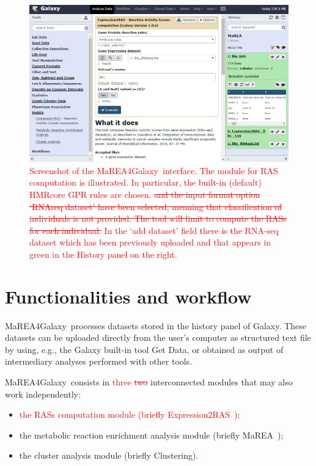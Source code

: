 \documentclass[preprint,12pt,authoryear]{elsarticle}
\newcommand{\red}{\textcolor{red}}
\newcommand{\mareagalaxy}{\textsf{MaREA4Galaxy}}
\newcommand{\mareaTool}{\textsf{MaREA}}
\newcommand{\clusterTool}{\textsf{Clustering}}
\newcommand{\RASTool}{\textsf{Expression2RAS}}
\begin{document}
\begin{figure}[ht]
  \includegraphics[width=1\textwidth]{figs/screenshot1v2q.png}
  \caption{\red{Screenshot of the \mareagalaxy\ interface. The module
      for RAS computation is illustrated. In particular, the built-in
      (default) HMRcore GPR rules are chosen. \sout{and the input
        format option `RNAseq dataset' have been selected, meaning
        that classification of individuals is not provided. The tool
        will limit to compute the RASs for each individual.} In the
      `add dataset' field there is the RNA-seq dataset which has been
      previously uploaded and that appears in green in the History
      panel on the right.}}
  \label{fig:screenshot1}
\end{figure}

 
\section{Functionalities and workflow}

\mareagalaxy\ processes datasets stored in the history panel of
Galaxy. These datasets can be uploaded directly from the user's
computer as structured text file by using, e.g., the Galaxy built-in
tool Get Data, or obtained as output of intermediary analyses
performed with other tools.
 
\mareagalaxy\ consists in \red{three \sout{two}} interconnected
modules that may also work independently:
\begin{itemize}
\item \red{the RASs computation module (briefly \RASTool~)};
\item the metabolic reaction enrichment analysis module (briefly
  \mareaTool~);
\item the cluster analysis module (briefly \clusterTool).
\end{itemize}
\end{document}
